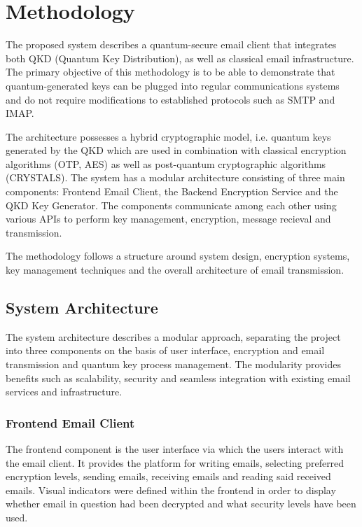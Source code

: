 \documentclass[conference]{IEEEtran}
\begin{document}
\section{Methodology}

The proposed system describes a quantum-secure email client that integrates both QKD (Quantum Key Distribution), as well as classical email infrastructure. The primary objective of this methodology is to be able to demonstrate that quantum-generated keys can be plugged into regular communications systems and do not require modifications to established protocols such as SMTP and IMAP.

The architecture possesses a hybrid cryptographic model, i.e. quantum keys generated by the QKD which are used in combination with classical encryption algorithms (OTP, AES) as well as post-quantum cryptographic algorithms (CRYSTALS). The system has a modular architecture consisting of three main components: Frontend Email Client, the Backend Encryption Service and the QKD Key Generator. The components communicate among each other using various APIs to perform key management, encryption, message recieval and transmission.

The methodology follows a structure around system design, encryption systems, key management techniques and the overall architecture of email transmission.

\subsection{System Architecture}\label{AA}

The system architecture describes a modular approach, separating the project into three components on the basis of user interface, encryption and email transmission and quantum key process management. The modularity provides benefits such as scalability, security and seamless integration with existing email services and infrastructure.

\subsubsection{Frontend Email Client}

The frontend component is the user interface via which the users interact with the email client. It provides the platform for writing emails, selecting preferred encryption levels, sending emails, receiving emails and reading said received emails. Visual indicators were defined within the frontend in order to display whether email in question had been decrypted and what security levels have been used.
\end{document}
